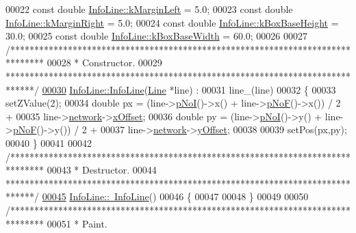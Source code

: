 \begin{DoxyCode}
00022 \textcolor{keyword}{const} \textcolor{keywordtype}{double} \hyperlink{class_info_line_a68232e6e5e3b63a4b6aced3d99291ad7}{InfoLine::kMarginLeft} = 5.0;
00023 \textcolor{keyword}{const} \textcolor{keywordtype}{double} \hyperlink{class_info_line_a0f0bd713ed9c1c8012bbd29dbd1db75e}{InfoLine::kMarginRight} = 5.0;
00024 \textcolor{keyword}{const} \textcolor{keywordtype}{double} \hyperlink{class_info_line_ab50f47aa54c45def219859e9da3755e6}{InfoLine::kBoxBaseHeight} = 30.0;
00025 \textcolor{keyword}{const} \textcolor{keywordtype}{double} \hyperlink{class_info_line_aad905589137b80ba75d9a1c49535eb1a}{InfoLine::kBoxBaseWidth} = 60.0;
00026 
00027 \textcolor{comment}{/*******************************************************************************}
00028 \textcolor{comment}{ * Constructor.}
00029 \textcolor{comment}{ ******************************************************************************/}
\hypertarget{infoline_8cpp_source_l00030}{}\hyperlink{class_info_line_a63819dbfeb257cc86be86f0fac3aa02f}{00030} \hyperlink{class_info_line_a63819dbfeb257cc86be86f0fac3aa02f}{InfoLine::InfoLine}(\hyperlink{class_line}{Line} *line) :
00031   line\_(line)
00032 \{
00033   setZValue(2);
00034   \textcolor{keywordtype}{double} px = (line->\hyperlink{group___models_gaeafd90e84ac2f8de2a879abe9e53eef3}{pNoI}()->x() + line->\hyperlink{group___models_gabbc73ddedd3075c33ae5331bd7c9829f}{pNoF}()->x()) / 2 +
00035               line->\hyperlink{class_line_aefdf6a6c3e3775b5a16b344c1d33964e}{network}->\hyperlink{class_network_a9f5c70be28a45320802bd0ac3947d114}{xOffset};
00036   \textcolor{keywordtype}{double} py = (line->\hyperlink{group___models_gaeafd90e84ac2f8de2a879abe9e53eef3}{pNoI}()->y() + line->\hyperlink{group___models_gabbc73ddedd3075c33ae5331bd7c9829f}{pNoF}()->y()) / 2 +
00037               line->\hyperlink{class_line_aefdf6a6c3e3775b5a16b344c1d33964e}{network}->\hyperlink{class_network_a771b16f7eb4459d0ca7141c048b1ab59}{yOffset};
00038 
00039   setPos(px,py);
00040 \}
00041 
00042 \textcolor{comment}{/*******************************************************************************}
00043 \textcolor{comment}{ * Destructor.}
00044 \textcolor{comment}{ ******************************************************************************/}
\hypertarget{infoline_8cpp_source_l00045}{}\hyperlink{class_info_line_ac3497eeb5f2719fb4fac42434955597d}{00045} \hyperlink{class_info_line_ac3497eeb5f2719fb4fac42434955597d}{InfoLine::~InfoLine}()
00046 \{
00047 
00048 \}
00049 
00050 \textcolor{comment}{/*******************************************************************************}
00051 \textcolor{comment}{ * Paint.}

\end{DoxyCode}
